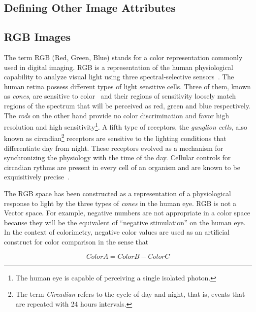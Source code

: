 

\subsection{Defining Other Image Attributes}
\label{sec:DefiningOtherImageAttributes}

\subsection{RGB Images}

The term RGB (Red, Green, Blue) stands for a color representation commonly used
in digital imaging. RGB is a representation of the human physiological
capability to analyze visual light using three spectral-selective
sensors~\cite{Malacara2002,Wyszecki2000}. The human retina possess different
types of light sensitive cells. Three of them, known as \emph{cones}, are
sensitive to color~\cite{Gray2003} and their regions of sensitivity loosely
match regions of the spectrum that will be perceived as red, green and blue
respectively. The \emph{rods} on the other hand provide no color discrimination
and favor high resolution and high sensitivity\footnote{The human eye is
capable of perceiving a single isolated photon.}.  A fifth type of receptors,
the \emph{ganglion cells}, also known as circadian\footnote{The term
\emph{Circadian} refers to the cycle of day and night, that is, events that are
repeated with 24 hours intervals.} receptors are sensitive to the lighting
conditions that differentiate day from night.  These receptors evolved as a
mechanism for synchronizing the physiology with the time of the day. Cellular
controls for circadian rythms are present in every cell of an organism and are
known to be exquisitively precise~\cite{Lodish2000}.

The RGB space has been constructed as a representation of a physiological
response to light by the three types of \emph{cones} in the human eye. RGB is
not a Vector space. For example, negative numbers are not appropriate in a
color space because they will be the equivalent of ``negative stimulation'' on
the human eye.  In the context of colorimetry, negative color values are used
as an artificial construct for color comparison in the sense that

\begin{equation}
\label{eqn:ColorSubtraction}
         ColorA = ColorB - ColorC
\end{equation}

